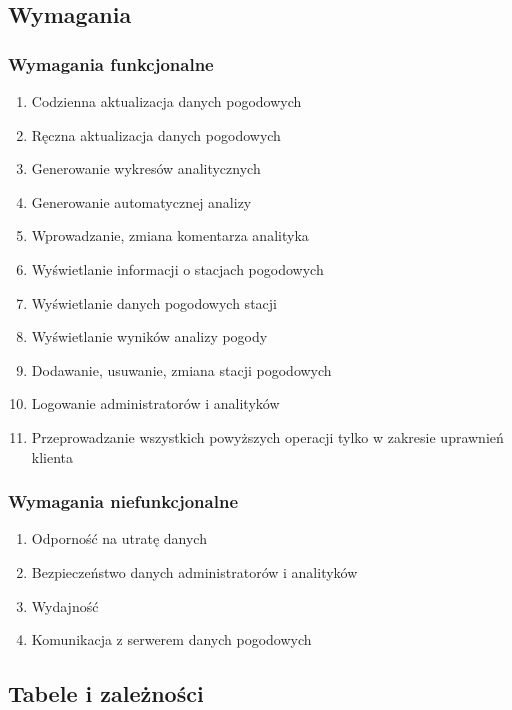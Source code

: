 \documentclass[12pt,a4paper]{article}
\begin{document}
\subsection{Wymagania}
\subsubsection{Wymagania funkcjonalne}
\begin{enumerate}
\item Codzienna aktualizacja danych pogodowych
\item Ręczna aktualizacja danych pogodowych
\item Generowanie wykresów analitycznych
\item Generowanie automatycznej analizy
\item Wprowadzanie, zmiana komentarza analityka
\item Wyświetlanie informacji o stacjach pogodowych
\item Wyświetlanie danych pogodowych stacji
\item Wyświetlanie wyników analizy pogody
\item Dodawanie, usuwanie, zmiana stacji pogodowych
\item Logowanie administratorów i analityków
\item Przeprowadzanie wszystkich powyższych operacji tylko w zakresie uprawnień klienta
\end{enumerate}
\subsubsection{Wymagania niefunkcjonalne}
\begin{enumerate}
\item Odporność na utratę danych
\item Bezpieczeństwo danych administratorów i analityków
\item Wydajność
\item Komunikacja z serwerem danych pogodowych
\end{enumerate}

\newpage
\subsection{Tabele i zależności}
\end{document}
